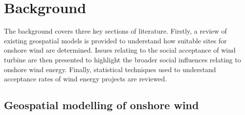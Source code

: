 \documentclass[a4paper,]{article}
\theoremstyle{definition}
\theoremstyle{definition}
\theoremstyle{definition}
\theoremstyle{remark}
\begin{document}
\hypertarget{background}{%
\section{Background}\label{background}}

The background covers three key sections of literature. Firstly, a
review of existing geospatial models is provided to understand how
suitable sites for onshore wind are determined. Issues relating to the
social acceptance of wind turbine are then presented to highlight the
broader social influences relating to onshore wind energy. Finally,
statistical techniques used to understand acceptance rates of wind
energy projects are reviewed.

\hypertarget{GIS}{%
\subsection{Geospatial modelling of onshore wind}\label{GIS}}
\end{document}
